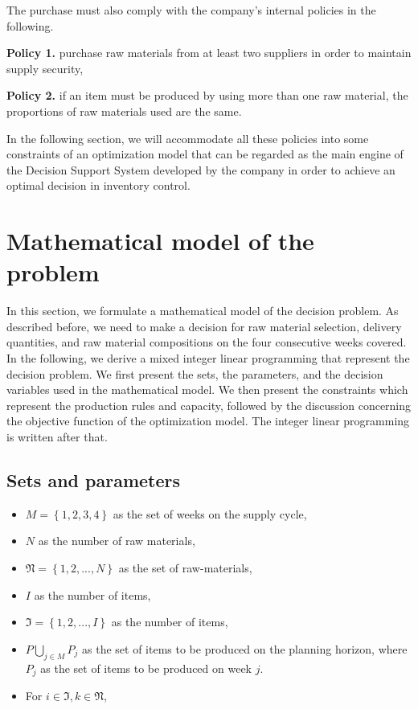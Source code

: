 \documentclass[preprint, 3p,
authoryear]{elsarticle} %
\providecommand{\tightlist}{%
  \setlength{\itemsep}{0pt}\setlength{\parskip}{0pt}}
\begin{document}
The purchase must also comply with the company's internal policies in
the following.

\textbf{Policy 1.} purchase raw materials from at least two suppliers in
order to maintain supply security,

\textbf{Policy 2.} if an item must be produced by using more than one
raw material, the proportions of raw materials used are the same.

In the following section, we will accommodate all these policies into
some constraints of an optimization model that can be regarded as the
main engine of the Decision Support System developed by the company in
order to achieve an optimal decision in inventory control.

\hypertarget{mathematical-model-of-the-problem}{%
\section{Mathematical model of the
problem}\label{mathematical-model-of-the-problem}}

In this section, we formulate a mathematical model of the decision
problem. As described before, we need to make a decision for raw
material selection, delivery quantities, and raw material compositions
on the four consecutive weeks covered. In the following, we derive a
mixed integer linear programming that represent the decision problem. We
first present the sets, the parameters, and the decision variables used
in the mathematical model. We then present the constraints which
represent the production rules and capacity, followed by the discussion
concerning the objective function of the optimization model. The integer
linear programming is written after that.

\hypertarget{sets-and-parameters}{%
\subsection{Sets and parameters}\label{sets-and-parameters}}

\begin{itemize}
\tightlist
\item
  \(M = \left\{ 1,2,3,4 \right\}\) as the set of weeks on the supply
  cycle,
\item
  \(N\) as the number of raw materials,
\item
  \(\mathfrak{N}= \left\{ 1,2,...,N \right\}\) as the set of
  raw-materials,
\item
  \(I\) as the number of items,
\item
  \(\mathfrak{I} = \left\{ 1, 2, ..., I \right\}\) as the number of
  items,
\item
  \(P \bigcup_{j \in M} P_j\) as the set of items to be produced on the
  planning horizon, where \(P_j\) as the set of items to be produced on
  week \(j\).
\item
  For \(i \in \mathfrak{I}, k \in \mathfrak{N}\),
\end{itemize}
\end{document}
